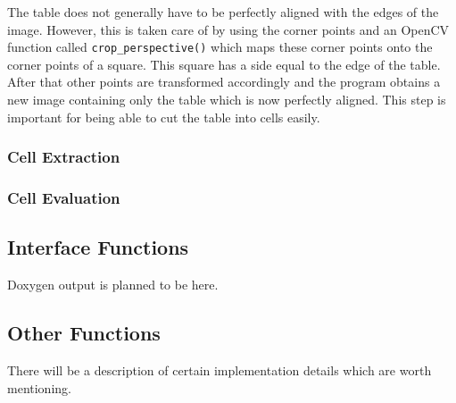 \documentclass{article}
\begin{document}
{{{		The table does not generally have to be perfectly aligned with the edges of the image. However, this is taken care of by using the corner points and an OpenCV function called \verb+crop_perspective()+ which maps these corner points onto the corner points of a square. This square has a side equal to the edge of the table. After that other points are transformed accordingly and the program obtains a new image containing only the table which is now perfectly aligned. This step is important for being able to cut the table into cells easily.
		}

		\subsubsection{Cell Extraction}{

		}

		\subsubsection{Cell Evaluation}{

		}
	}

	\subsection{Interface Functions}{
	Doxygen output is planned to be here.
	}

	\subsection{Other Functions}{
	There will be a description of certain implementation details which are worth mentioning.
	}
}
\end{document}
